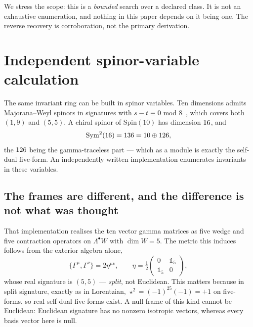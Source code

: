 \documentclass[11pt,a4paper]{article}
\begin{document}
We stress the scope: this is a \emph{bounded} search over a declared class. It is
not an exhaustive enumeration, and nothing in this paper depends on it being one.
The reverse recovery is corroboration, not the primary derivation.

\section{Independent spinor-variable calculation}
\label{sec:spinor}

The same invariant ring can be built in spinor variables. Ten dimensions admits Majorana--Weyl spinors in signatures with $s-t \equiv 0$
mod $8$~\cite{Kugo:1982bn}, which covers both $(1,9)$ and $(5,5)$. A chiral
spinor of $\mathrm{Spin}(10)$ has dimension $16$, and
\begin{equation}
  \mathrm{Sym}^2(16) = 136 = 10 \oplus 126,
\end{equation}
the $126$ being the gamma-traceless part --- which as a module is
exactly the self-dual five-form. An independently written implementation
enumerates invariants in these variables.

\subsection{The frames are different, and the difference is not what was thought}
\label{sec:signature}

That implementation realises the ten vector gamma matrices as five wedge and five
contraction operators on $\Lambda^\bullet W$ with $\dim W = 5$. The metric this
induces follows from the exterior algebra alone,
\begin{equation}
  \{\Gamma^\mu,\Gamma^\nu\} = 2\eta^{\mu\nu},
  \qquad
  \eta = \tfrac12\begin{pmatrix} 0 & \mathbb{1}_5\\ \mathbb{1}_5 & 0\end{pmatrix},
\end{equation}
whose real signature is $(5,5)$ --- \emph{split}, not Euclidean. This matters
because in split signature, exactly as in Lorentzian,
$\star^2 = (-1)^{25}(-1) = +1$ on five-forms, so real self-dual five-forms exist.
A null frame of this kind cannot be Euclidean: Euclidean signature has no
nonzero isotropic vectors, whereas every basis vector here is null.
\end{document}
